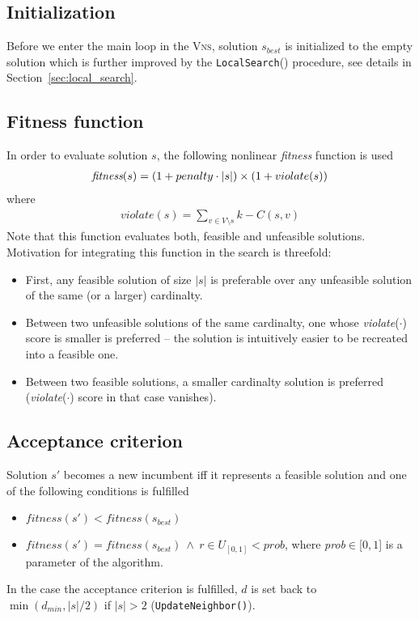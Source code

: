 \documentclass[dvipsnames,format=sigconf,anonymous=true,review=true]{acmart}
\begin{document}
    \subsection{Initialization}
      Before we enter the main loop in the \textsc{Vns}, solution $s_{best}$ is initialized to the empty solution    which is further improved by the \texttt{LocalSearch}() procedure, see details in Section~\ref{sec:local_search}. 
 
   \subsection{Fitness function}
       In order to evaluate solution $s$, the following nonlinear \emph{fitness} function is used 
       \begin{align}\label{eq:fitness}
          \emph{fitness}(s) = ( 1+ penalty \cdot |s|) \times ( 1 + violate(s))
       \end{align}
       where 
       \begin{align}
       	   violate(s) = \sum_{v \in V \setminus s}   k - C(s, v)  
       \end{align}
   Note that this function evaluates both, feasible and unfeasible solutions. 
       Motivation for integrating this function  in the search is threefold:
       \begin{itemize}
       	\item First, any feasible solution of size $|s|$ is preferable over any unfeasible solution of the same (or a larger) cardinalty. 
       	\item Between two unfeasible solutions of the same cardinalty, one whose \emph{violate}($\cdot$) score is smaller is preferred -- the solution is intuitively easier to be recreated into a feasible one.  
       	\item Between two feasible solutions, a smaller cardinalty solution is preferred (\emph{violate}($\cdot$) score in that case vanishes). 
       \end{itemize}
   
   \subsection{Acceptance criterion}
   
   Solution $s'$ becomes a new incumbent iff it represents a feasible solution and  one of the following conditions is fulfilled
   \begin{itemize}
   	\item $fitness(s') < fitness(s_{best})$ 
   	\item  $fitness(s') = fitness(s_{best})\  \wedge\ r \in U_{\left[0, 1\right]} <  prob  $, where \emph{prob}$\in$[$0,1$] is a parameter of the algorithm.
   \end{itemize}
    In the case the acceptance criterion is fulfilled, $d$ is set back to $\min(d_{min}, |s|/2)$ if $|s|>2$ (\texttt{UpdateNeighbor()}). 
   
\end{document}
